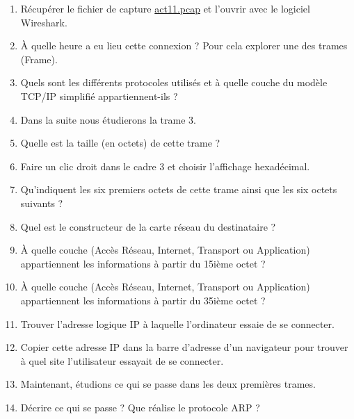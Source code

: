 \begin{exercice_cours}{}
    
    \begin{enumerate}
        \item Récupérer le fichier de capture \href{}{act11.pcap} et l'ouvrir avec le logiciel Wireshark. 
        \item À quelle heure a eu lieu cette connexion ? Pour cela explorer une des trames (Frame).
        \item  Quels sont les différents protocoles utilisés et à quelle couche du modèle TCP/IP simplifié appartiennent-ils ?
        \item Dans la suite nous étudierons la trame 3.
        \item Quelle est la taille (en octets) de cette trame ?
        \item Faire un clic droit dans le cadre 3 et choisir l'affichage hexadécimal.
        \item Qu'indiquent les six premiers octets de cette trame ainsi que les six octets suivants ?
        \item Quel est le constructeur de la carte réseau du destinataire ?
        \item À quelle couche (Accès Réseau, Internet, Transport ou Application) appartiennent les informations à partir du 15ième octet ?
        \item À quelle couche (Accès Réseau, Internet, Transport ou Application) appartiennent les informations à partir du 35ième octet ?
        \item Trouver l'adresse logique IP à laquelle l'ordinateur essaie de se connecter.
        \item Copier cette adresse IP dans la barre d'adresse d'un navigateur pour trouver à quel site l'utilisateur essayait de se connecter.
        \item Maintenant, étudions ce qui se passe dans les deux premières trames.
        \item Décrire ce qui se passe ? Que réalise le protocole ARP ?
    \end{enumerate}
\end{exercice_cours}